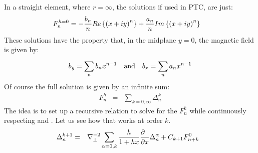 In a straight element, where %
$r=
\infty $,
the solutions if  used in PTC, are just:
%
\begin{eqnarray}{F}_{n}^{h=
0}&=-{{b}_{n} \over n}Re\left\{{{\left({x+iy}\right)}^{n}}\right\}+{{a}_{n} \over n}Im\left\{{{\left({x+iy}\right)}^{n}}\right\}  \label{eq:hsol} \end{eqnarray}
%
%
These solutions have the property that, in the midplane $y=0$,  the magnetic field is given by:
%
\begin{eqnarray}{b}_{y}=
\sum\limits_{n}^{} {b}_{n}{x}^{n-1}~~~{\text a}{\text n}{\text d} ~~~{b}_{x}=
\sum\limits_{n}^{} {a}_{n}{x}^{n-1} \label{eq:st:anbn}\end{eqnarray}
%
%
Of course the full solution is given by an infinite sum:
%
\begin{eqnarray}{F}_{n}^{h} &=
& \sum\limits_{k=
0,\infty }^{} {\Delta }_{n}^{k}\label{fnk}\end{eqnarray}
%
%
The idea is to set up a recursive relation to solve for the $F_n^k$ while continuously respecting  and . Let us see how that works at order $k$. 
%
\begin{eqnarray}{\Delta }_{n}^{k+1} &=
&{\nabla }_{\perp }^{-2}\sum\limits_{\alpha =
0,k}^{} {h \over 1+hx}{\partial \hphantom{x} \over \partial x}{\Delta }_{n}^{\alpha }+{C}_{k+1}{F}_{n+k}^{0}\ \ \label{eq:sol:anbn}\end{eqnarray}
